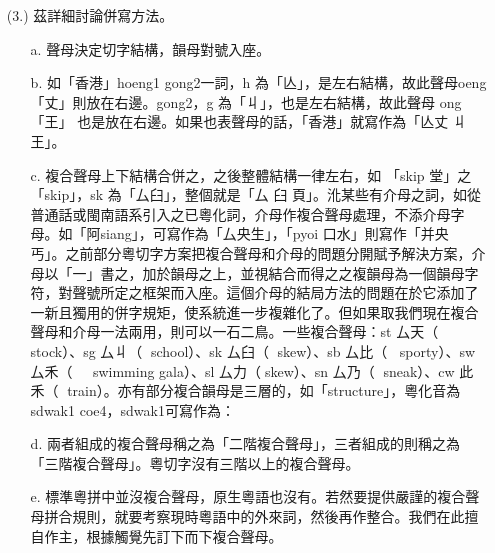 \documentclass[a5paper, 12pt, openany]{book} %
\begin{document}
\begin{itemize}
\begin{itemize}
  \end{itemize}
  
  \item[(3.)] 茲詳細討論併寫方法。
    \begin{itemize}
    

      \item[a.] 聲母決定切字結構，韻母對號入座。
  
      \item[b.]	如「香港」hoeng1 gong2一詞，h 為「亾」，是左右結構，故此聲母oeng「丈」則放在右邊。gong2，g 為「丩」，也是左右結構，故此聲母 ong「王」 也是放在右邊。如果也表聲母的話，「香港」就寫作為「亾丈    丩王」。
  
      \item[c.]	複合聲母上下結構合併之，之後整體結構一律左右，如 「skip 堂」之「skip」，sk 為「厶臼」，整個就是「厶 臼 頁」。沎某些有介母之詞，如從普通話或閩南語系引入之已粵化詞，介母作複合聲母處理，不添介母字母。如「阿siang」，可寫作為「厶央生」，「pyoi 口水」則寫作「并央 丐」。之前部分粵切字方案把複合聲母和介母的問題分開賦予解決方案，介母以「一」書之，加於韻母之上，並視結合而得之之複韻母為一個韻母字符，對聲號所定之框架而入座。這個介母的結局方法的問題在於它添加了一新且獨用的併字規矩，使系統進一步複雜化了。但如果取我們現在複合聲母和介母一法兩用，則可以一石二鳥。一些複合聲母：st 厶天（ stock）、sg 厶丩（ school）、sk 厶臼（ skew）、sb 厶比（ sporty）、sw 厶禾（ swimming gala）、sl 厶力（skew）、sn 厶乃（ sneak）、cw 此禾（ train）。亦有部分複合韻母是三層的，如「structure」，粵化音為 sdwak1 coe4，sdwak1可寫作為：
      
      \item[d.]	兩者組成的複合聲母稱之為「二階複合聲母」，三者組成的則稱之為「三階複合聲母」。粵切字沒有三階以上的複合聲母。 
  
      \item[e.]	標準粵拼中並沒複合聲母，原生粵語也沒有。若然要提供嚴謹的複合聲母拼合規則，就要考察現時粵語中的外來詞，然後再作整合。我們在此擅自作主，根據觸覺先訂下而下複合聲母。 
  \end{itemize}
  
\end{itemize}
\end{document}
